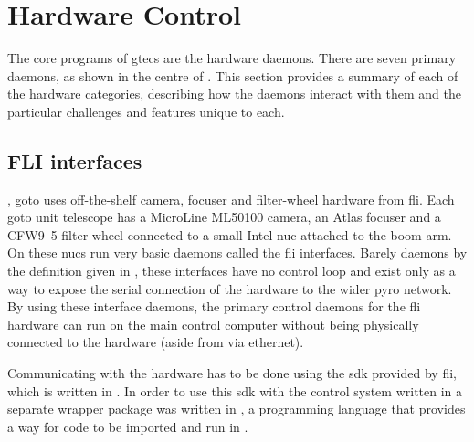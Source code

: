 \section{Hardware Control}
\label{sec:hardware_control}
\begin{colsection}


\begin{colsection}

The core programs of \gls{gtecs} are the hardware daemons. There are seven primary daemons, as shown in the centre of . This section provides a summary of each of the hardware categories, describing how the daemons interact with them and the particular challenges and features unique to each.

\end{colsection}


\subsection{FLI interfaces}
\label{sec:fli}
\begin{colsection}

, \gls{goto} uses off-the-shelf camera, focuser and filter-wheel hardware from \gls{fli}. Each \gls{goto} unit telescope has a MicroLine ML50100 camera, an Atlas focuser and a CFW9--5 filter wheel connected to a small Intel \gls{nuc} attached to the boom arm. On these \glspl{nuc} run very basic daemons called the \gls{fli} interfaces. Barely daemons by the definition given in , these interfaces have no control loop and exist only as a way to expose the serial connection of the hardware to the wider \gls{pyro} network. By using these interface daemons, the primary control daemons for the \gls{fli} hardware can run on the main control computer without being physically connected to the hardware (aside from via ethernet).

Communicating with the hardware has to be done using the \gls{sdk} provided by \gls{fli}, which is written in . In order to use this \gls{sdk} with the control system written in  a separate wrapper package  was written in , a programming language that provides a way for  code to be imported and run in .


\end{colsection}
\end{colsection}
